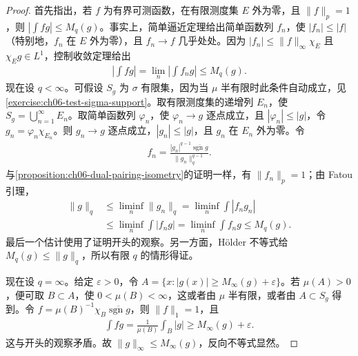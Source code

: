 \documentclass[../../main.tex]{subfiles}
\begin{document}
\begin{proof}
首先指出，若 $f$ 为有界可测函数，在有限测度集 $E$ 外为零，且 $\|f\|_p=1$，则 $|\int fg|\leqslant M_q(g)$。事实上，简单逼近定理给出简单函数列 $f_n$，使 $|f_n|\leqslant|f|$（特别地，$f_n$ 在 $E$ 外为零），且 $f_n\to f$ 几乎处处。因为 $|f_n|\leqslant\|f\|_\infty\chi_E$ 且 $\chi_Eg\in L^1$，控制收敛定理给出
\begin{align*}
\left|\int fg\right|=\lim_n\left|\int f_ng\right|\leqslant M_q(g).
\end{align*}
现在设 $q<\infty$。可假设 $S_g$ 为 $\sigma$ 有限集，因为当 $\mu$ 半有限时此条件自动成立，见\cref{exercise:ch06-test-sigma-support}。取有限测度集的递增列 $E_n$，使 $S_g=\bigcup_{n=1}^\infty E_n$。取简单函数列 $\varphi_n$，使 $\varphi_n\to g$ 逐点成立，且 $|\varphi_n|\leqslant|g|$，令 $g_n=\varphi_n\chi_{E_n}$。则 $g_n\to g$ 逐点成立，$|g_n|\leqslant|g|$，且 $g_n$ 在 $E_n$ 外为零。令
\begin{align*}
f_n=\frac{|g_n|^{q-1}\overline{\operatorname{sgn}g}}{\|g_n\|_q^{q-1}}.
\end{align*}
与\cref{proposition:ch06-dual-pairing-isometry}的证明一样，有 $\|f_n\|_p=1$；由 Fatou 引理，
\begin{align*}
\|g\|_q&\leqslant\liminf_n\|g_n\|_q
=\liminf_n\int|f_ng_n|\\
&\leqslant\liminf_n\int|f_ng|
=\liminf_n\int f_ng\leqslant M_q(g).
\end{align*}
最后一个估计使用了证明开头的观察。另一方面，Hölder 不等式给 $M_q(g)\leqslant\|g\|_q$，所以有限 $q$ 的情形得证。

现在设 $q=\infty$。给定 $\varepsilon>0$，令 $A=\{x:|g(x)|\geqslant M_\infty(g)+\varepsilon\}$。若 $\mu(A)>0$，便可取 $B\subset A$，使 $0<\mu(B)<\infty$，这或者由 $\mu$ 半有限，或者由 $A\subset S_g$ 得到。令 $f=\mu(B)^{-1}\chi_B\overline{\operatorname{sgn}g}$，则 $\|f\|_1=1$，且
\begin{align*}
\int fg=\frac{1}{\mu(B)}\int_B|g|\geqslant M_\infty(g)+\varepsilon.
\end{align*}
这与开头的观察矛盾。故 $\|g\|_\infty\leqslant M_\infty(g)$，反向不等式显然。
\end{proof}
\end{document}
